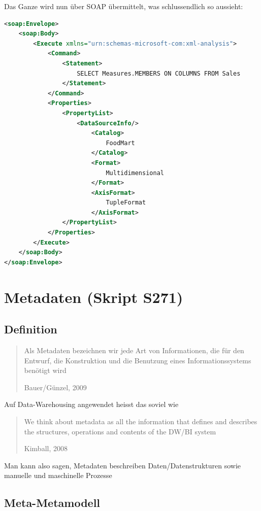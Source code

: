 \documentclass[a4paper, 11pt, nofootinbib]{article}
\begin{document}
\noindent Das Ganze wird nun über SOAP übermittelt, was schlussendlich so aussieht:

\begin{lstlisting}[language=xml, captionpos=b, caption={SELECT-Anfrage in XMLA verpackt, über SOAP versendet}]
<soap:Envelope>
	<soap:Body>
		<Execute xmlns="urn:schemas-microsoft-com:xml-analysis">
			<Command>
				<Statement>
					SELECT Measures.MEMBERS ON COLUMNS FROM Sales
				</Statement>
			</Command>
			<Properties>
				<PropertyList>
					<DataSourceInfo/>
						<Catalog>
							FoodMart
						</Catalog>
						<Format>
							Multidimensional
						</Format>
						<AxisFormat>
							TupleFormat
						</AxisFormat>
				</PropertyList>
			</Properties>
		</Execute>
	</soap:Body>
</soap:Envelope>
\end{lstlisting}
\restoregeometry

\section{Metadaten (Skript S271)}

\subsection{Definition}
\begin{center}
	\blockquote[Bauer/Günzel, 2009]{Als Metadaten bezeichnen wir jede Art von Informationen, die für den Entwurf, die Konstruktion und die Benutzung eines Informationssystems benötigt wird \\}
\end{center}

\noindent Auf Data-Warehousing angewendet heisst das soviel wie

\begin{center}
	\blockquote[Kimball, 2008]{We think about metadata as all the information that defines and describes the structures, operations and contents of the DW/BI system}
\end{center}

\noindent Man kann also sagen, Metadaten beschreiben Daten/Datenstrukturen sowie manuelle und maschinelle Prozesse

\subsection{Meta-Metamodell}
\end{document}
